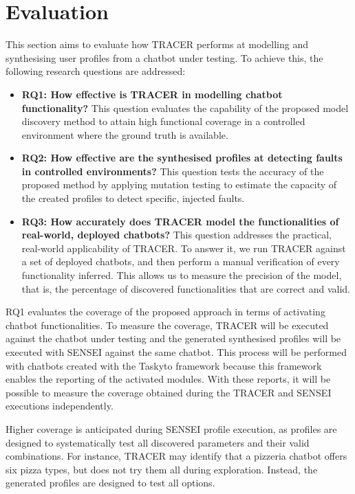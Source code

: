 
\chapter{Evaluation}\label{chapter:evaluation}

This section aims to
evaluate how \ac{TRACER} performs at
modelling and synthesising user profiles
from a chatbot under testing.
To achieve this, the following research questions are addressed:

\begin{itemize}
\item \textbf{RQ1: How effective is TRACER in modelling chatbot functionality?}
  This question evaluates the capability of the proposed model discovery method to attain high functional coverage in a controlled environment where the ground truth is available.
\item \textbf{RQ2: How effective are the synthesised profiles at detecting faults in controlled environments?}
  This question tests the accuracy of the proposed method by applying mutation testing \autocite{gomez-abajoMutationTestingTaskOriented2024} to estimate the capacity of the created profiles to detect specific, injected faults.
\item \textbf{RQ3: How accurately does TRACER model the functionalities of real-world, deployed chatbots?}
  This question addresses the practical, real-world applicability of \ac{TRACER}.
  To answer it, we run \ac{TRACER} against a set of deployed chatbots,
  and then perform a manual verification of every functionality inferred.
  This allows us to measure the precision of the model,
  that is, the percentage of discovered functionalities that are correct and valid.
\end{itemize}

RQ1 evaluates the coverage of the proposed approach
in terms of activating chatbot functionalities.
To measure the coverage, \ac{TRACER} will be executed
against the chatbot under testing
and the generated synthesised profiles
will be executed with SENSEI against the same chatbot.
This process will be performed with chatbots created with the Taskyto framework
because this framework enables the reporting of the activated modules.
With these reports, it will be possible to measure
the coverage obtained during the \ac{TRACER} and SENSEI executions independently.

Higher coverage is anticipated during SENSEI profile execution,
as profiles are designed to systematically test all discovered parameters
and their valid combinations.
For instance, \ac{TRACER} may identify that a pizzeria chatbot
offers six pizza types, but does not try them all during exploration.
Instead, the generated profiles are designed to test all options.

